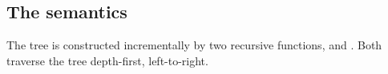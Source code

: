 \documentclass[sigplan,10pt,anonymous,review]{acmart}
\begin{document}
%   
%   

%   



\subsection{The semantics}


\newcommand{\dingv}{\makebox[0pt][l]{\ensuremath{\square}}\raisebox{.15ex}{\hspace{0.1em}\ensuremath{\checkmark}}}
\newcommand{\dingx}{\makebox[0pt][l]{\ensuremath{\square}}\raisebox{.0ex}{\hspace{0.01em}\ensuremath{\times}}}
\newcommand{\dings}{\ensuremath{\square\!\!\!\!\cdot\;}}
\newcommand{\dingss}{\ensuremath{\square\!\!\!\cdot\;}}

The tree is constructed incrementally by two recursive
functions, \step and \na. Both traverse the tree depth-first, left-to-right.
\end{document}
